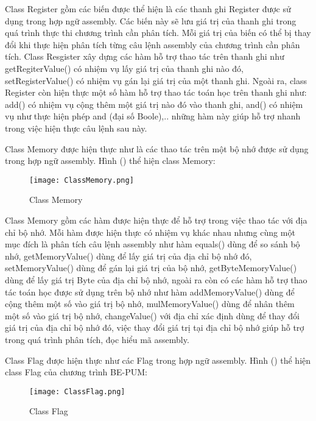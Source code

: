 	Class Register gồm các biến được thể hiện là các thanh ghi Register được sử dụng trong hợp ngữ assembly. Các biến này sẽ lưu giá trị của thanh ghi trong quá trình thực thi chương trình cần phân tích. Mỗi giá trị của biến có thể bị thay đổi khi thực hiện phân tích từng câu lệnh assembly của chương trình cần phân tích. Class Resgister xây dựng các hàm hỗ trợ thao tác trên thanh ghi như getRegiterValue() có nhiệm vụ lấy giá trị của thanh ghi nào đó, setRegisterValue() có nhiệm vụ gán lại giá trị của một thanh ghi. Ngoài ra, class Register còn hiện thực một số hàm hỗ trợ thao tác toán học trên thanh ghi như: add() có nhiệm vụ cộng thêm một giá trị nào đó vào thanh ghi, and() có nhiệm vụ như thực hiện phép and (đại số Boole),.. những hàm này giúp hỗ trợ nhanh trong việc hiện thực câu lệnh sau này.
	
		\newpage
	Class Memory được hiện thực như là các thao tác trên một bộ nhớ được sử dụng trong hợp ngữ assembly. Hình () thể hiện class Memory: 
	
		\begin{center}
			\begin{figure}[htp]
				\begin{center}
					\texttt{[image: ClassMemory.png]}
				\end{center}
				\caption{Class Memory}	
					\label{fig:ClassMemory}		
			\end{figure}
		\end{center}		
	
	Class Memory gồm các hàm được hiện thực để hỗ trợ trong việc thao tác với địa chỉ bộ nhớ. Mỗi hàm được hiện thực có nhiệm vụ khác nhau nhưng cùng một mục đích là phân tích câu lệnh assembly như hàm equals() dùng để so sánh bộ nhớ, getMemoryValue() dùng để lấy giá trị của địa chỉ bộ nhớ đó, setMemoryValue() dùng để gán lại giá trị của bộ nhớ, getByteMemoryValue() dùng để lấy giá trị Byte của địa chỉ bộ nhớ, ngoài ra còn có các hàm hỗ trợ thao tác toán học được sử dụng trên bộ nhớ như hàm addMemoryValue() dùng để cộng thêm một số vào giá trị bộ nhớ, mulMemoryValue() dùng để nhân thêm một số vào giá trị bộ nhớ, changeValue() với địa chỉ xác định dùng để thay đổi giá trị của địa chỉ bộ nhớ đó, việc thay đổi giá trị tại địa chỉ bộ nhớ giúp hỗ trợ trong quá trình phân tích, đọc hiểu mã assembly.
	
	\newpage
	Class Flag được hiện thực như các Flag trong hợp ngữ assembly. Hình () thể hiện class Flag của chương trình BE-PUM:	
		\begin{center}
			\begin{figure}[htp]
				\begin{center}
					\texttt{[image: ClassFlag.png]}
				\end{center}
				\caption{Class Flag}	
					\label{fig:ClassFlag}		
			\end{figure}
		\end{center}			
	
